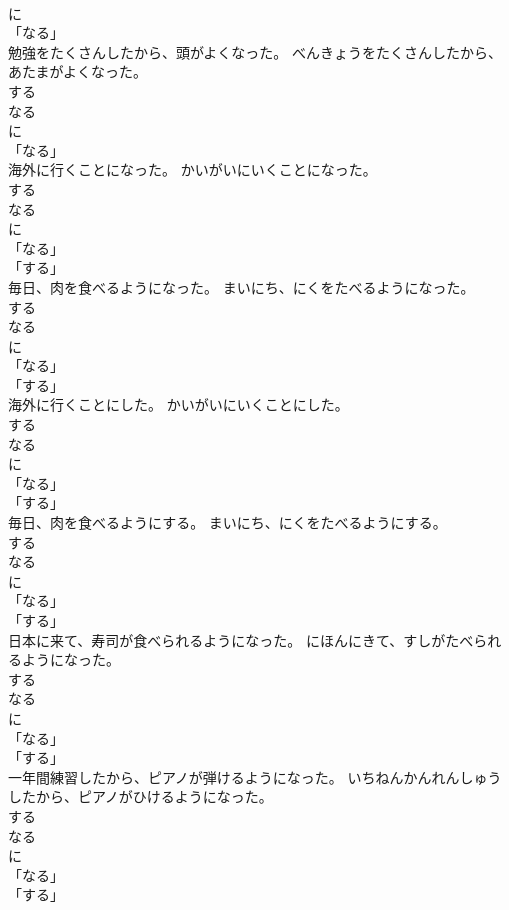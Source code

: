 \documentclass[8pt]{extreport}
\begin{document}
\begin{CJK}{UTF8}{min}
\\	に 
\\	「なる」 
\\	勉強をたくさんしたから、頭がよくなった。	べんきょうをたくさんしたから、あたまがよくなった。	
\\	する 
\\	なる 
\\	に 
\\	「なる」 
\\	海外に行くことになった。	かいがいにいくことになった。	
\\	する 
\\	なる 
\\	に 
\\	「なる」 
\\	「する」 
\\	毎日、肉を食べるようになった。	まいにち、にくをたべるようになった。	
\\	する 
\\	なる 
\\	に 
\\	「なる」 
\\	「する」 
\\	海外に行くことにした。	かいがいにいくことにした。	
\\	する 
\\	なる 
\\	に 
\\	「なる」 
\\	「する」 
\\	毎日、肉を食べるようにする。	まいにち、にくをたべるようにする。	
\\	する 
\\	なる 
\\	に 
\\	「なる」 
\\	「する」 
\\	日本に来て、寿司が食べられるようになった。	にほんにきて、すしがたべられるようになった。	
\\	する 
\\	なる 
\\	に 
\\	「なる」 
\\	「する」 
\\	一年間練習したから、ピアノが弾けるようになった。	いちねんかんれんしゅうしたから、ピアノがひけるようになった。	
\\	する 
\\	なる 
\\	に 
\\	「なる」 
\\	「する」 

\end{CJK}
\end{document}
